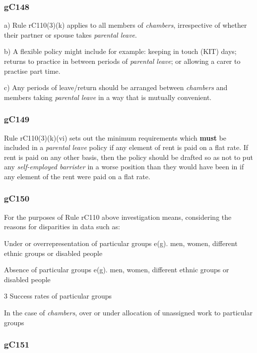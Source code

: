 \subsubsection{\color{darkgrey}gC148}

a) Rule rC110(3)(k) applies to all members of \emph{chambers},
irrespective of whether their partner or spouse takes \emph{parental
leave}.

b) A flexible policy might include for example: keeping in touch (KIT)
days; returns to practice in between periods of \emph{parental leave};
or allowing a carer to practise part time.

c) Any periods of leave/return should be arranged between
\emph{chambers} and members taking \emph{parental leave} in a way that
is mutually convenient.

\subsubsection{\color{darkgrey}gC149}

Rule rC110(3)(k)(vi) sets out the minimum requirements which \textcolor{myred}{\textbf{must}} be
included in a \emph{parental leave} policy if any element of rent is
paid on a flat rate. If rent is paid on any other basis, then the policy
should be drafted so as not to put any \emph{self-employed barrister} in
a worse position than they would have been in if any element of the rent
were paid on a flat rate.

\subsubsection{\color{darkgrey}gC150}

For the purposes of Rule rC110 above investigation means, considering
the reasons for disparities in data such as:
\begin{numlist}\item Under or overrepresentation of particular groups e(g). men, women,
different ethnic groups or disabled people
\item Absence of particular groups e(g). men, women, different ethnic groups
or disabled people

3 Success rates of particular groups
\item In the case of \emph{chambers}, over or under allocation of
unassigned work to particular groups
\end{numlist}
\subsubsection{\color{darkgrey}gC151}

